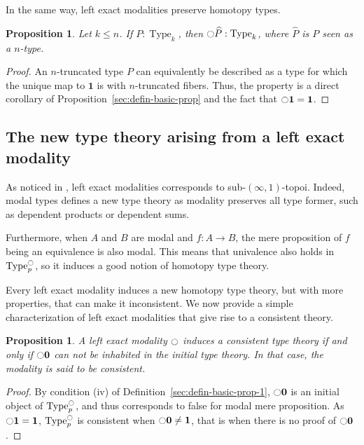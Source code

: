 \documentclass[conference]{IEEEtran}
\newtheorem{prop}[thm]{Proposition}
\newcommand{\mynote}[2]{
    \fbox{\bfseries\sffamily\scriptsize#1}
    {\small$\blacktriangleright$\textsf{\emph{#2}}$\blacktriangleleft$}~}
\newcommand\nt[1]{\mynote{NT}{#1}}
\DeclareMathOperator{\Type}{Type}
\newcommand{\modal}{\ensuremath{\ocircle}}
\newcommand \zero {\mathbf{0}}
\newcommand \one {\mathbf{1}}
\begin{document}
In the same way, left exact modalities preserve homotopy types.
\begin{prop}
  Let $k \leq n$.
  If $P:\Type_k$, then $\modal \widehat P : \Type_k$, where $\widehat P$
  is $P$ seen as a $n$-type.
\end{prop}
\begin{proof}
  An $n$-truncated type $P$ can equivalently be described as a type for
  which the unique map to $\one$ is with $n$-truncated fibers. Thus, the
  property is a direct corollary of
  Proposition~\ref{sec:defin-basic-prop} and the fact that $\modal \one =
  \one$.
\end{proof}

\subsection{The new type theory arising from a left exact modality}
\label{sec:new-type-theory}

As noticed in \cite{hottbook}, left exact modalities corresponds 
to sub-$(\infty,1)$-topoi. Indeed, modal types defines a new type
theory as modality preserves all type former, such as dependent
products or dependent sums.

Furthermore, when $A$ and $B$ are modal and $f : A \to B$, the mere
proposition of $f$ being an equivalence is also modal. This means that
univalence also holds in $\Type^\modal_p$, so it induces a good notion
of homotopy type theory.

Every left exact modality induces a new homotopy type theory, but with more
properties, that can make it inconsistent. We now provide a simple
characterization of left exact modalities that give rise to a
consistent theory.

\begin{prop}\label{prop:consistent}
  A left exact modality $\modal$ induces a consistent type theory if
  and only if $\modal \zero$ can not be inhabited in the initial type
  theory. In that case, the modality is said to be consistent.
\end{prop}
\begin{proof}
  By condition (iv) of Definition~\ref{sec:defin-basic-prop-1},
  $\modal \zero$ is an initial object of $\Type^\modal_p$, and thus
  corresponds to false for modal mere proposition.
  As $\modal \one = \one$, $\Type^\modal_p$ is consistent when
  $\modal \zero \neq \one$, that is when there is no proof of
  $\modal \zero$.
\end{proof}
\end{document}

